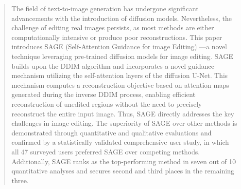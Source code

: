 \begin{abstract}

    The field of text-to-image generation has undergone significant advancements with the introduction of diffusion models. {\modified{}Nevertheless}, the challenge of editing real images persists, as most methods are {\modified{}either computationally intensive or produce poor reconstructions}. {\modified{}This paper introduces SAGE} (Self-Attention Guidance for image Editing) —a novel technique leveraging pre-trained diffusion models for image editing. SAGE builds upon the DDIM algorithm and incorporates a novel guidance mechanism utilizing the self-attention layers of the diffusion U-Net. This mechanism computes a reconstruction objective based on attention maps generated during the inverse DDIM process, enabling efficient reconstruction of unedited regions without the need to precisely reconstruct the entire input image. Thus, SAGE directly addresses the key challenges in image editing. The superiority of SAGE over other methods is demonstrated through quantitative and qualitative evaluations and confirmed by a statistically validated comprehensive user study, in which all 47 surveyed users preferred SAGE over competing methods. Additionally, SAGE ranks as the top-performing method in seven out of 10 quantitative analyses and secures second and third places in the remaining three.
    
\end{abstract}